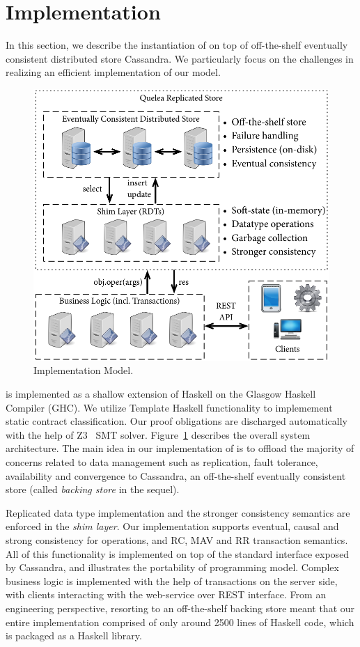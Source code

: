 \section{Implementation}

In this section, we describe the instantiation of \name on top of off-the-shelf
eventually consistent distributed store Cassandra. We particularly focus on the
challenges in realizing an efficient implementation of our model.

\begin{figure}
\begin{center}
\includegraphics[width=0.9\columnwidth]{Figures/ImplModel}
\end{center}
\caption{Implementation Model.}
\label{fig:impl_mod}
\end{figure}

\name is implemented as a shallow extension of Haskell on the Glasgow Haskell
Compiler (GHC). We utilize Template Haskell functionality to implemement static
contract classification. Our proof obligations are discharged automatically
with the help of Z3~\cite{} SMT solver. Figure~\ref{fig:impl_mod} describes the
overall system architecture. The main idea in our implementation of \name is to
offload the majority of concerns related to data management such as
replication, fault tolerance, availability and convergence to Cassandra, an
off-the-shelf eventually consistent store (called \emph{backing store} in the
sequel).

Replicated data type implementation and the stronger consistency semantics are
enforced in the \emph{shim layer}. Our implementation supports eventual, causal
and strong consistency for operations, and RC, MAV and RR transaction
semantics. All of this functionality is implemented on top of the standard
interface exposed by Cassandra, and illustrates the portability of \name
programming model. Complex business logic is implemented with the help of
transactions on the server side, with clients interacting with the web-service
over REST interface. From an engineering perspective, resorting to an
off-the-shelf backing store meant that our entire implementation comprised of
only around 2500 lines of Haskell code, which is packaged as a Haskell library.

